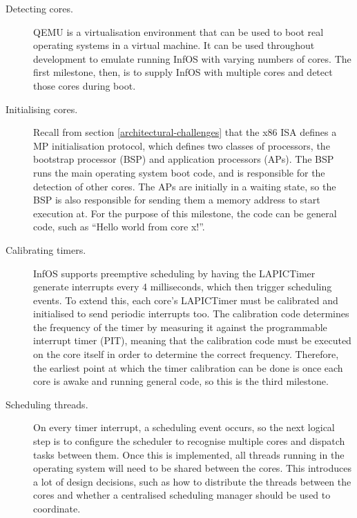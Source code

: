 \documentclass[bsc,frontabs,singlespacing,parskip,deptreport]{infthesis}
\begin{document}
\begin{description}
\item [Detecting cores.] QEMU \cite{qemu} is a virtualisation environment that can be used to boot real operating systems in a virtual machine. It can be used throughout development to emulate running InfOS with varying numbers of cores. The first milestone, then, is to supply InfOS with multiple cores and detect those cores during boot.

\item [Initialising cores.] Recall from section \ref{architectural-challenges} that the x86 ISA defines a MP initialisation protocol, which defines two classes of processors, the bootstrap processor (BSP) and application processors (APs). The BSP runs the main operating system boot code, and is responsible for the detection of other cores. The APs are initially in a waiting state, so the BSP is also responsible for sending them a memory address to start execution at. For the purpose of this milestone, the code can be general code, such as “Hello world from core x!”.

\item[Calibrating timers.] InfOS supports preemptive scheduling by having the LAPICTimer generate interrupts every 4 milliseconds, which then trigger scheduling events. To extend this, each core’s LAPICTimer must be calibrated and initialised to send periodic interrupts too. The calibration code determines the frequency of the timer by measuring it against the programmable interrupt timer (PIT), meaning that the calibration code must be executed on the core itself in order to determine the correct frequency. Therefore, the earliest point at which the timer calibration can be done is once each core is awake and running general code, so this is the third milestone.  

\item[Scheduling threads.] On every timer interrupt, a scheduling event occurs, so the next logical step is to configure the scheduler to recognise multiple cores and dispatch tasks between them. Once this is implemented, all threads running in the operating system will need to be shared between the cores. This introduces a lot of design decisions, such as how to distribute the threads between the cores and whether a centralised scheduling manager should be used to coordinate.
\end{description}
\end{document}
